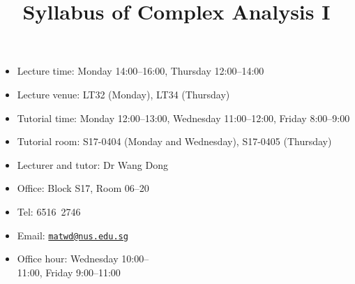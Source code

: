\documentclass[a4paper]{article}
\title{Syllabus of Complex Analysis I}
\date{}
\begin{document}
\maketitle

\begin{minipage}[t]{0.5\linewidth}
  \begin{itemize}[leftmargin=*]
  \item Lecture time: Monday 14:00--16:00, Thursday 12:00--14:00
  \item Lecture venue: LT32 (Monday), LT34 (Thursday)
  \item Tutorial time: Monday 12:00--13:00, Wednesday 11:00--12:00, Friday 8:00--9:00
  \item Tutorial room: S17-0404 (Monday and Wednesday), S17-0405 (Thursday)
  \end{itemize}
\end{minipage}
\begin{minipage}[t]{0.4\linewidth}
  \begin{itemize}
  \item Lecturer and tutor: Dr Wang Dong
  \item Office: Block S17, Room 06--20
  \item Tel: 6516\ 2746
  \item Email: \href{mailto:matwd@nus.edu.sg}{\nolinkurl{matwd@nus.edu.sg}}
  \item Office hour: Wednesday 10:00-- \\ 11:00, Friday 9:00--11:00
  \end{itemize}
\end{minipage}
\end{document}
